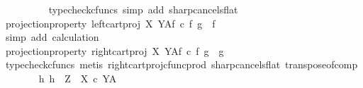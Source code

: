 \begin{isabellebody}
\ \ \ \ \ \ \ \ \isamarkupfalse%
\ {\isacharparenleft}{\kern0pt}typecheck{\isacharunderscore}{\kern0pt}cfuncs{\isacharcomma}{\kern0pt}\ simp\ add{\isacharcolon}{\kern0pt}\ sharp{\isacharunderscore}{\kern0pt}cancels{\isacharunderscore}{\kern0pt}flat{\isacharparenright}{\kern0pt}\isanewline
\ \ \ \ \ \ \isamarkupfalse%
\ \isamarkupfalse%
\ projection{\isacharunderscore}{\kern0pt}property{}{\isacharcolon}{\kern0pt}\ {\isachardoublequoteopen}{\isacharparenleft}{\kern0pt}{\isacharparenleft}{\kern0pt}left{\isacharunderscore}{\kern0pt}cart{\isacharunderscore}{\kern0pt}proj\ X\ Y{\isacharparenright}{\kern0pt}\isactrlbsup A\isactrlesup \isactrlsub f{\isacharparenright}{\kern0pt}\ {\isasymcirc}\isactrlsub c\ {\isasymlangle}f\isactrlsup {\isasymflat}\ {\isacharcomma}{\kern0pt}g\isactrlsup {\isasymflat}{\isasymrangle}\isactrlsup {\isasymsharp}\ {\isacharequal}{\kern0pt}\ f{\isachardoublequoteclose}\isanewline
\ \ \ \ \ \ \ \ \isamarkupfalse%
\ {\isacharparenleft}{\kern0pt}simp\ add{\isacharcolon}{\kern0pt}\ calculation{\isacharparenright}{\kern0pt}\isanewline
\ \ \ \ \ \ \isamarkupfalse%
\ projection{\isacharunderscore}{\kern0pt}property{}{\isacharcolon}{\kern0pt}\ {\isachardoublequoteopen}{\isacharparenleft}{\kern0pt}{\isacharparenleft}{\kern0pt}right{\isacharunderscore}{\kern0pt}cart{\isacharunderscore}{\kern0pt}proj\ X\ Y{\isacharparenright}{\kern0pt}\isactrlbsup A\isactrlesup \isactrlsub f{\isacharparenright}{\kern0pt}\ {\isasymcirc}\isactrlsub c\ {\isasymlangle}f\isactrlsup {\isasymflat}\ {\isacharcomma}{\kern0pt}g\isactrlsup {\isasymflat}{\isasymrangle}\isactrlsup {\isasymsharp}\ {\isacharequal}{\kern0pt}\ g{\isachardoublequoteclose}\isanewline
\ \ \ \ \ \ \ \ \isamarkupfalse%
\ {\isacharparenleft}{\kern0pt}typecheck{\isacharunderscore}{\kern0pt}cfuncs{\isacharcomma}{\kern0pt}\ metis\ right{\isacharunderscore}{\kern0pt}cart{\isacharunderscore}{\kern0pt}proj{\isacharunderscore}{\kern0pt}cfunc{\isacharunderscore}{\kern0pt}prod\ sharp{\isacharunderscore}{\kern0pt}cancels{\isacharunderscore}{\kern0pt}flat\ transpose{\isacharunderscore}{\kern0pt}of{\isacharunderscore}{\kern0pt}comp{\isacharparenright}{\kern0pt}\isanewline
\ \ \ \ \ \ \isamarkupfalse%
\ {\isachardoublequoteopen}{\isasymAnd}h{}{\isachardot}{\kern0pt}\ h{}\ {\isacharcolon}{\kern0pt}\ Z\ {\isasymrightarrow}\ {\isacharparenleft}{\kern0pt}X\ {\isasymtimes}\isactrlsub c\ Y{\isacharparenright}{\kern0pt}\isactrlbsup A\isactrlesup \ {\isasymLongrightarrow}\isanewline

\end{isabellebody}
